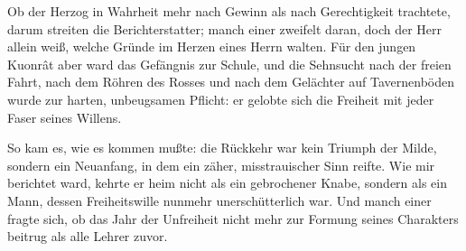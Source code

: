 Ob der Herzog in Wahrheit mehr nach Gewinn als nach Gerechtigkeit trachtete, darum streiten die Berichterstatter; manch einer zweifelt daran, doch der Herr allein weiß, welche Gründe im Herzen eines Herrn walten. Für den jungen Kuonr\^{a}t aber ward das Gefängnis zur Schule, und die Sehnsucht nach der freien Fahrt, nach dem Röhren des Rosses und nach dem Gelächter auf Tavernenböden wurde zur harten, unbeugsamen Pflicht: er gelobte sich die \gls{Freiheit} mit jeder Faser seines Willens.

So kam es, wie es kommen mußte: die Rückkehr war kein Triumph der Milde, sondern ein Neuanfang, in dem ein zäher, misstrauischer Sinn reifte. Wie mir berichtet ward, kehrte er heim nicht als ein gebrochener Knabe, sondern als ein Mann, dessen Freiheitswille nunmehr unerschütterlich war. Und manch einer fragte sich, ob das Jahr der Unfreiheit nicht mehr zur Formung seines Charakters beitrug als alle Lehrer zuvor.
